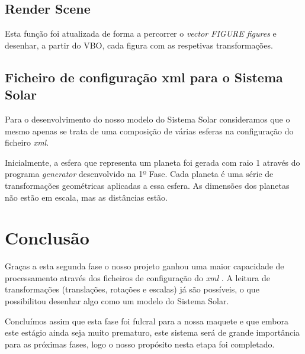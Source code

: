 \documentclass[11pt,a4paper]{report}
\begin{document}
\section{Render Scene}
Esta função foi atualizada de forma a percorrer o \emph{vector FIGURE figures} e desenhar, a partir do VBO, cada figura com as respetivas transformações.
\section{Ficheiro de configuração xml para o Sistema Solar}
Para o desenvolvimento do nosso modelo do Sistema Solar consideramos que o mesmo apenas se trata de uma composição de várias esferas na configuração do ficheiro  \emph{xml}.

Inicialmente, a esfera que representa um planeta foi gerada com raio 1 através do programa \emph{generator} desenvolvido na 1º Fase. Cada planeta é uma série de transformações geométricas aplicadas a essa esfera. As dimensões dos planetas não estão em escala, mas as distâncias estão.

\chapter{Conclusão}

Graças a esta segunda fase o nosso projeto ganhou uma maior capacidade de processamento através dos ficheiros de configuração do \emph{xml} .
A leitura de transformações (translações, rotações e escalas) já são possíveis, o que possibilitou desenhar algo como um modelo do Sistema Solar.

Concluímos assim que esta fase foi fulcral para a nossa maquete e que embora este estágio ainda seja muito prematuro, este sistema será de grande importância para as próximas fases, logo o nosso propósito nesta etapa foi completado.
\end{document}
